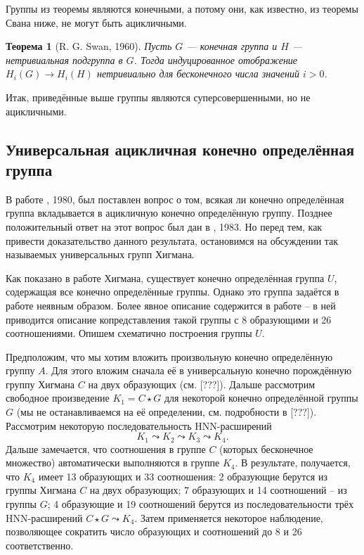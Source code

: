 \documentclass[14pt, dvipsnames]{extarticle}
\newtheorem{theorem}{Теорема}
\theoremstyle{definition}
\theoremstyle{remark}
\begin{document}
Группы из теоремы являются конечными, а потому они, как известно, из теоремы Свана ниже, не могут быть ацикличными. 

\begin{theorem}[R. G. Swan, 1960]
Пусть $G$ --- конечная группа и $H$ --- нетривиальная подгруппа в $G$. Тогда индуцированное отображение $H_i(G)\to H_i(H)$ нетривиально для бесконечного числа значений $i>0$. 
\end{theorem}


Итак, приведённые выше группы являются суперсовершенными, но не ацикличными.








\subsection{Универсальная ацикличная конечно определённая группа}

В работе \cite{BDH}, 1980, был поставлен вопрос о том, всякая ли конечно определённая группа вкладывается в ацикличную конечно определённую группу. Позднее положительный ответ на этот вопрос был дан в \cite{BousfieldUniversal}, 1983. Но перед тем, как привести доказательство данного результата, остановимся на обсуждении так называемых универсальных групп Хигмана.

Как показано в работе \cite{UniversalHigmanGroup} Хигмана, существует конечно определённая группа $U$, содержащая все конечно определённые группы. Однако это группа задаётся в работе неявным образом. Более явное описание содержится в работе \cite{ExplicityPresentation} -- в ней приводится описание копредставления такой группы с 8 образующими и 26 соотношениями. Опишем схематично построения группы $U$.

Предположим, что мы хотим вложить произвольную конечно определённую группу $A$. Для этого вложим сначала её в универсальную конечно порождённую группу Хигмана $C$ на двух образующих (см. [???]). Дальше рассмотрим свободное произведение $K_1 = C\star G$ для некоторой конечно определённой группы $G$ (мы не останавливаемся на её определении, см. подробности в [???]). Рассмотрим некоторую последовательность HNN-расширений $$K_1\leadsto K_2\leadsto K_3\leadsto K_4.$$ Дальше замечается, что соотношения в группе $C$ (которых бесконечное множество) автоматически выполняются в группе $K_4$. В результате, получается, что $K_4$ имеет 13 образующих и 33 соотношения: 2 образующие берутся из группы Хигмана $C$ на двух образующих; 7 образующих и 14 соотношений -- из группы $G$; 4 образующие и 19 соотношений берутся из последовательности трёх HNN-расширений $C\star G\leadsto K_4$. Затем применяется некоторое наблюдение, позволяющее сократить число образующих и соотношений до 8 и 26 соответственно.       
\end{document}
